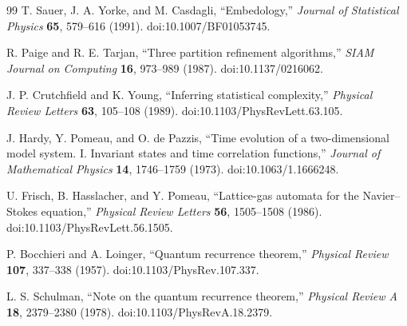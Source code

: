 \documentclass[11pt]{article}
\begin{document}
\begin{thebibliography}{99}
T. Sauer, J. A. Yorke, and M. Casdagli,
``Embedology,''
\emph{Journal of Statistical Physics} \textbf{65}, 579--616 (1991).
doi:10.1007/BF01053745.

R. Paige and R. E. Tarjan,
``Three partition refinement algorithms,''
\emph{SIAM Journal on Computing} \textbf{16}, 973--989 (1987).
doi:10.1137/0216062.

J. P. Crutchfield and K. Young,
``Inferring statistical complexity,''
\emph{Physical Review Letters} \textbf{63}, 105--108 (1989).
doi:10.1103/PhysRevLett.63.105.

J. Hardy, Y. Pomeau, and O. de Pazzis,
``Time evolution of a two-dimensional model system. I. Invariant states and
time correlation functions,''
\emph{Journal of Mathematical Physics} \textbf{14}, 1746--1759 (1973).
doi:10.1063/1.1666248.

U. Frisch, B. Hasslacher, and Y. Pomeau,
``Lattice-gas automata for the Navier--Stokes equation,''
\emph{Physical Review Letters} \textbf{56}, 1505--1508 (1986).
doi:10.1103/PhysRevLett.56.1505.

P. Bocchieri and A. Loinger,
``Quantum recurrence theorem,''
\emph{Physical Review} \textbf{107}, 337--338 (1957).
doi:10.1103/PhysRev.107.337.

L. S. Schulman,
``Note on the quantum recurrence theorem,''
\emph{Physical Review A} \textbf{18}, 2379--2380 (1978).
doi:10.1103/PhysRevA.18.2379.

\end{thebibliography}
\end{document}
